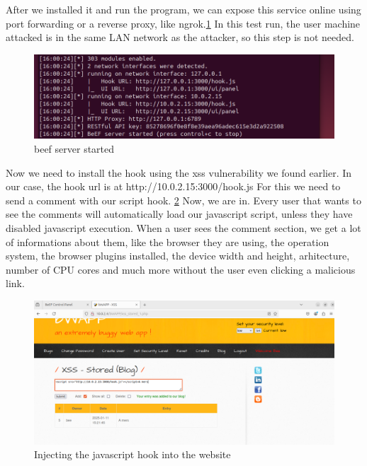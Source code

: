 \documentclass{article}
\begin{document}
After we installed it and run the program, we can expose this service online using port forwarding or a reverse proxy, like ngrok.\ref{fig:beef-server-started}
In this test run, the user machine attacked is in the same LAN network as the attacker, so this step is not needed.

\begin{figure}
    \centering
    \includegraphics[width=1\linewidth]{Figures/beef/beef-server-started.png}
    \caption{\label{fig:beef-server-started}beef server started}
\end{figure}


Now we need to install the hook using the xss vulnerability we found earlier. In our case, the hook url is at http://10.0.2.15:3000/hook.js
For this we need to send a comment with our script hook. \ref{fig:inject-hook}
Now, we are in. Every user that wants to see the comments will automatically load our javascript script, unless they have disabled javascript execution.
When a user sees the comment section, we get a lot of informations about them, like the browser they are using, the operation system, the browser plugins installed, the device width and height, arhitecture, number of CPU cores and much more without the user even clicking a malicious link.

\begin{figure}
    \centering
    \includegraphics[width=1\linewidth]{Figures/beef/inject-hook.png}
    \caption{\label{fig:inject-hook}Injecting the javascript hook into the website}
\end{figure}
\end{document}
